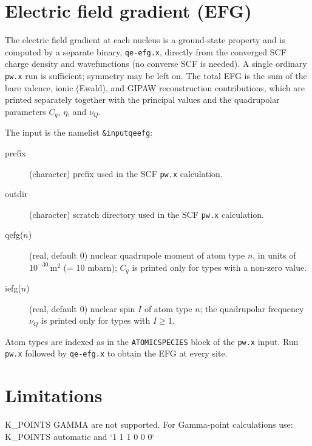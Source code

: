 \documentclass[a4paper,11pt,twoside]{article}
\begin{document}
\section{Electric field gradient (EFG)}
The electric field gradient at each nucleus is a ground-state property and is computed by a
separate binary, \texttt{qe-efg.x}, directly from the converged SCF charge density and
wavefunctions (no converse SCF is needed). A single ordinary \texttt{pw.x} run is sufficient;
symmetry may be left on. The total EFG is the sum of the bare valence, ionic (Ewald), and GIPAW
reconstruction contributions, which are printed separately together with the principal values and
the quadrupolar parameters $C_q$, $\eta$, and $\nu_Q$.

The input is the namelist \texttt{\&input\textunderscore{}qeefg}:
\begin{description}
\item[prefix] (character) prefix used in the SCF \texttt{pw.x} calculation.
\item[outdir] (character) scratch directory used in the SCF \texttt{pw.x} calculation.
\item[q\textunderscore{}efg($n$)] (real, default $0$) nuclear quadrupole moment of atom type $n$,
in units of $10^{-30}\,\mathrm{m}^2$ (= 10 mbarn); $C_q$ is printed only for types with a non-zero value.
\item[i\textunderscore{}efg($n$)] (real, default $0$) nuclear spin $I$ of atom type $n$; the
quadrupolar frequency $\nu_Q$ is printed only for types with $I \ge 1$.
\end{description}
Atom types are indexed as in the \texttt{ATOMIC\textunderscore{}SPECIES} block of the \texttt{pw.x}
input. Run \texttt{pw.x} followed by \texttt{qe-efg.x} to obtain the EFG at every site.

\section{Limitations}
K\_POINTS GAMMA are not supported. For Gamma-point calculations use: K\_POINTS automatic and `1 1 1 0 0 0`


\end{document}
